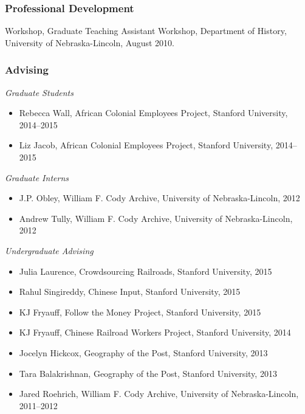 \hypertarget{professional-development-1}{%
\subsubsection{Professional
Development}\label{professional-development-1}}

Workshop, Graduate Teaching Assistant Workshop, Department of History,
University of Nebraska-Lincoln, August 2010.

\hypertarget{advising}{%
\subsubsection{Advising}\label{advising}}

\emph{Graduate Students}

\begin{itemize}
\tightlist
\item
  Rebecca Wall, African Colonial Employees Project, Stanford University,
  2014--2015
\item
  Liz Jacob, African Colonial Employees Project, Stanford University,
  2014--2015
\end{itemize}

\emph{Graduate Interns}

\begin{itemize}
\tightlist
\item
  J.P. Obley, William F. Cody Archive, University of Nebraska-Lincoln,
  2012
\item
  Andrew Tully, William F. Cody Archive, University of Nebraska-Lincoln,
  2012
\end{itemize}

\emph{Undergraduate Advising}

\begin{itemize}
\tightlist
\item
  Julia Laurence, Crowdsourcing Railroads, Stanford University, 2015
\item
  Rahul Singireddy, Chinese Input, Stanford University, 2015
\item
  KJ Fryauff, Follow the Money Project, Stanford University, 2015
\item
  KJ Fryauff, Chinese Railroad Workers Project, Stanford University,
  2014
\item
  Jocelyn Hickcox, Geography of the Post, Stanford University, 2013
\item
  Tara Balakrishnan, Geography of the Post, Stanford University, 2013
\item
  Jared Roehrich, William F. Cody Archive, University of
  Nebraska-Lincoln, 2011--2012
\end{itemize}

